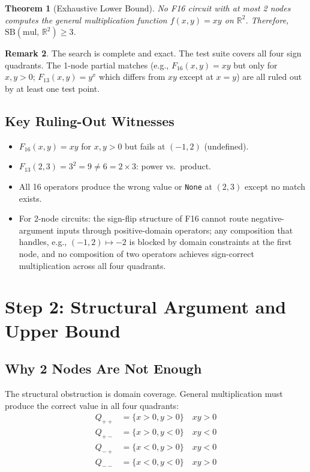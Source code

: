 \documentclass[12pt]{article}
\newtheorem{theorem}{Theorem}
\theoremstyle{definition}
\newtheorem{remark}[theorem]{Remark}
\begin{document}
\begin{theorem}[Exhaustive Lower Bound]
No F16 circuit with at most 2 nodes computes the general multiplication function
$f(x, y) = xy$ on $\mathbb{R}^2$.  Therefore,
$\mathrm{SB}(\mathrm{mul},\, \mathbb{R}^2) \geq 3$.
\end{theorem}

\begin{remark}
The search is complete and exact.  The test suite covers all four sign quadrants.
The 1-node partial matches (e.g., $F_{16}(x, y) = xy$ but only for $x, y > 0$;
$F_{13}(x, y) = y^x$ which differs from $xy$ except at $x = y$) are all ruled
out by at least one test point.
\end{remark}

\subsection{Key Ruling-Out Witnesses}

\begin{itemize}
  \item $F_{16}(x, y) = xy$ for $x, y > 0$ but fails at $(-1, 2)$ (undefined).
  \item $F_{13}(2, 3) = 3^2 = 9 \neq 6 = 2 \times 3$: power vs.\ product.
  \item All 16 operators produce the wrong value or \texttt{None} at $(2, 3)$
    except no match exists.
  \item For 2-node circuits: the sign-flip structure of F16 cannot route
    negative-argument inputs through positive-domain operators; any composition
    that handles, e.g., $(-1, 2) \mapsto -2$ is blocked by domain constraints
    at the first node, and no composition of two operators achieves
    sign-correct multiplication across all four quadrants.
\end{itemize}

\section{Step 2: Structural Argument and Upper Bound}

\subsection{Why 2 Nodes Are Not Enough}

The structural obstruction is domain coverage.  General multiplication must
produce the correct value in all four quadrants:
\begin{align*}
Q_{++} &= \{x > 0, y > 0\} \quad xy > 0 \\
Q_{+-} &= \{x > 0, y < 0\} \quad xy < 0 \\
Q_{-+} &= \{x < 0, y > 0\} \quad xy < 0 \\
Q_{--} &= \{x < 0, y < 0\} \quad xy > 0
\end{align*}
\end{document}
